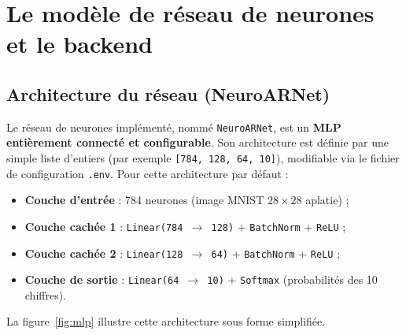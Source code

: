 \documentclass[12pt,a4paper]{report}
\begin{document}
\chapter{Le mod\`ele de r\'eseau de neurones et le backend}
\label{chap:backend}

\section{Architecture du r\'eseau (NeuroARNet)}

Le r\'eseau de neurones impl\'ement\'e, nomm\'e \texttt{NeuroARNet}, est un
\textbf{MLP enti\`erement connect\'e et configurable}. Son architecture est
d\'efinie par une simple liste d'entiers (par exemple
\texttt{[784, 128, 64, 10]}), modifiable via le fichier de configuration
\texttt{.env}. Pour cette architecture par d\'efaut :

\begin{itemize}
    \item \textbf{Couche d'entr\'ee} : 784 neurones (image MNIST $28\times28$
    aplatie) ;
    \item \textbf{Couche cach\'ee 1} : \texttt{Linear(784 $\rightarrow$ 128)}
    + \texttt{BatchNorm} + \texttt{ReLU} ;
    \item \textbf{Couche cach\'ee 2} : \texttt{Linear(128 $\rightarrow$ 64)}
    + \texttt{BatchNorm} + \texttt{ReLU} ;
    \item \textbf{Couche de sortie} : \texttt{Linear(64 $\rightarrow$ 10)} +
    \texttt{Softmax} (probabilit\'es des 10 chiffres).
\end{itemize}

La figure~\ref{fig:mlp} illustre cette architecture sous forme simplifi\'ee.
\end{document}
